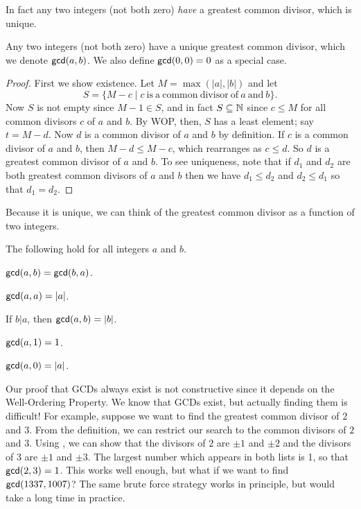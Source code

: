 In fact any two integers (not both zero) \emph{have} a greatest common divisor, which is unique.

\begin{prop}\label{prop:zz-gcds-exist}
Any two integers (not both zero) have a unique greatest common divisor, which we denote \(\mathsf{gcd}(a, b)\).
We also define \(\mathsf{gcd}(0, 0) = 0\) as a special case.
\end{prop}

\begin{proof}
First we show existence.
Let \(M = \max(|a|,|b|)\) and let \[ S = \{ M - c \mid c\ \mathrm{is\ a\ common\ divisor\ of}\ a\ \mathrm{and}\ b \}. \]
Now \(S\) is not empty since \(M - 1 \in S\), and in fact \(S \subseteq \mathbb{N}\) since \(c \leq M\) for all common divisors \(c\) of \(a\) and \(b\).
By WOP, then, \(S\) has a least element; say \(t = M - d\).
Now \(d\) is a common divisor of \(a\) and \(b\) by definition.
If \(c\) is a common divisor of \(a\) and \(b\), then \(M - d \leq M - c\), which rearranges as \(c \leq d\).
So \(d\) is a greatest common divisor of \(a\) and \(b\).
To see uniqueness, note that if \(d_1\) and \(d_2\) are both greatest common divisors of \(a\) and \(b\) then we have \(d_1 \leq d_2\) and \(d_2 \leq d_1\) so that \(d_1 = d_2\).
\end{proof}

Because it is unique, we can think of the greatest common divisor as a function of two integers.

\begin{prop}
The following hold for all integers \(a\) and \(b\).
\begin{proplist*}
\item \(\mathsf{gcd}(a, b) = \mathsf{gcd}(b, a)\).
\item \(\mathsf{gcd}(a, a) = |a|\).
\item If \(b|a\), then \(\mathsf{gcd}(a, b) = |b|\).
\item \(\mathsf{gcd}(a, 1) = 1\).
\item \(\mathsf{gcd}(a, 0) = |a|\).
\end{proplist*}
\end{prop}

Our proof that GCDs always exist is not constructive since it depends on the Well-Ordering Property.
We know that GCDs exist, but actually finding them is difficult!
For example, suppose we want to find the greatest common divisor of \(2\) and \(3\).
From the definition, we can restrict our search to the common divisors of \(2\) and \(3\).
Using , we can show that the divisors of \(2\) are \(\pm 1\) and \(\pm 2\) and the divisors of \(3\) are \(\pm 1\) and \(\pm 3\).
The largest number which appears in both lists is 1, so that \(\mathsf{gcd}(2, 3) = 1\).
This works well enough, but what if we want to find \(\mathsf{gcd}(1337, 1007)\)?
The same brute force strategy works in principle, but would take a long time in practice.

